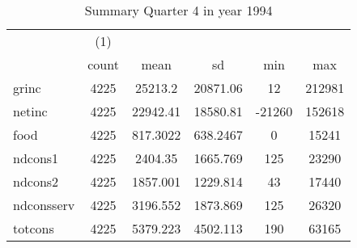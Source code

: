 \begin{table}[htbp]\centering
\def\sym#1{\ifmmode^{#1}\else\(^{#1}\)\fi}
\caption{Summary Quarter 4 in year 1994 \label{sum\_Q4\_y1994}}
\begin{tabular}{l*{1}{ccccc}}
\hline\hline
            &\multicolumn{1}{c}{(1)}&            &            &            &            \\
            &       count&        mean&          sd&         min&         max\\
\hline
grinc       &        4225&     25213.2&    20871.06&          12&      212981\\
netinc      &        4225&    22942.41&    18580.81&      -21260&      152618\\
food        &        4225&    817.3022&    638.2467&           0&       15241\\
ndcons1     &        4225&     2404.35&    1665.769&         125&       23290\\
ndcons2     &        4225&    1857.001&    1229.814&          43&       17440\\
ndconsserv  &        4225&    3196.552&    1873.869&         125&       26320\\
totcons     &        4225&    5379.223&    4502.113&         190&       63165\\
\hline\hline
\end{tabular}
\end{table}
